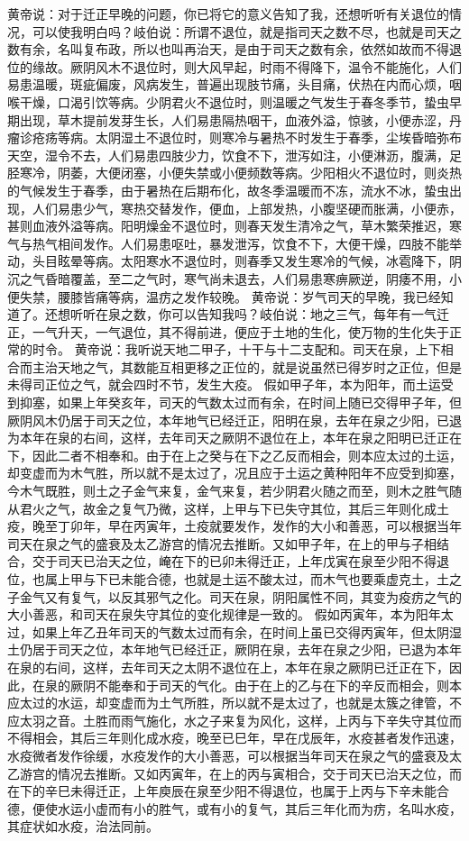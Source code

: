\documentclass[a4paper,12pt,UTF8,twoside]{ctexbook}
\begin{document}
黄帝说：对于迁正早晚的问题，你已将它的意义告知了我，还想听听有关退位的情况，可以使我明白吗？岐伯说：所谓不退位，就是指司天之数不尽，也就是司天之数有余，名叫复布政，所以也叫再治天，是由于司天之数有余，依然如故而不得退位的缘故。厥阴风木不退位时，则大风早起，时雨不得降下，温令不能施化，人们易患温暖，斑疵偏废，风病发生，普遍出现肢节痛，头目痛，伏热在内而心烦，咽喉干燥，口渴引饮等病。少阴君火不退位时，则温暖之气发生于春冬季节，蛰虫早期出现，草木提前发芽生长，人们易患隔热咽干，血液外溢，惊骇，小便赤涩，丹瘤诊疮疡等病。太阴湿土不退位时，则寒冷与暑热不时发生于春季，尘埃昏暗弥布天空，湿令不去，人们易患四肢少力，饮食不下，泄泻如注，小便淋沥，腹满，足胫寒冷，阴萎，大便闭塞，小便失禁或小便频数等病。少阳相火不退位时，则炎热的气候发生于春季，由于暑热在后期布化，故冬季温暖而不冻，流水不冰，蛰虫出现，人们易患少气，寒热交替发作，便血，上部发热，小腹坚硬而胀满，小便赤，甚则血液外溢等病。阳明燥金不退位时，则春天发生清冷之气，草木繁荣推迟，寒气与热气相间发作。人们易患呕吐，暴发泄泻，饮食不下，大便干燥，四肢不能举动，头目眩晕等病。太阳寒水不退位时，则春季又发生寒冷的气候，冰雹降下，阴沉之气昏暗覆盖，至二之气时，寒气尚未退去，人们易患寒痹厥逆，阴痿不用，小便失禁，腰膝皆痛等病，温疠之发作较晚。
黄帝说：岁气司天的早晚，我已经知道了。还想听听在泉之数，你可以告知我吗？岐伯说：地之三气，每年有一气迁正，一气升天，一气退位，其不得前进，便应于土地的生化，使万物的生化失于正常的时令。
黄帝说：我听说天地二甲子，十干与十二支配和。司天在泉，上下相合而主治天地之气，其数能互相更移之正位的，就是说虽然已得岁时之正位，但是未得司正位之气，就会四时不节，发生大疫。
假如甲子年，本为阳年，而土运受到抑塞，如果上年癸亥年，司天的气数太过而有余，在时间上随已交得甲子年，但厥阴风木仍居于司天之位，本年地气已经迁正，阳明在泉，去年在泉之少阳，已退为本年在泉的右间，这样，去年司天之厥阴不退位在上，本年在泉之阳明已迁正在下，因此二者不相奉和。由于在上之癸与在下之乙反而相会，则本应太过的土运，却变虚而为木气胜，所以就不是太过了，况且应于土运之黄种阳年不应受到抑塞，今木气既胜，则土之子金气来复，金气来复，若少阴君火随之而至，则木之胜气随从君火之气，故金之复气乃微，这样，上甲与下已失守其位，其后三年则化成土疫，晚至丁卯年，早在丙寅年，土疫就要发作，发作的大小和善恶，可以根据当年司天在泉之气的盛衰及太乙游宫的情况去推断。又如甲子年，在上的甲与子相结合，交于司天已治天之位，崦在下的已卯未得迁正，上年戊寅在泉至少阳不得退位，也属上甲与下已未能合德，也就是土运不酸太过，而木气也要乘虚克土，土之子金气又有复气，以反其邪气之化。司天在泉，阴阳属性不同，其变为疫疠之气的大小善恶，和司天在泉失守其位的变化规律是一致的。
假如丙寅年，本为阳年太过，如果上年乙丑年司天的气数太过而有余，在时间上虽已交得丙寅年，但太阴湿土仍居于司天之位，本年地气已经迁正，厥阴在泉，去年在泉之少阳，已退为本年在泉的右间，这样，去年司天之太阴不退位在上，本年在泉之厥阴已迁正在下，因此，在泉的厥阴不能奉和于司天的气化。由于在上的乙与在下的辛反而相会，则本应太过的水运，却变虚而为土气所胜，所以就不是太过了，也就是太簇之律管，不应太羽之音。土胜而雨气施化，水之子来复为风化，这样，上丙与下辛失守其位而不得相会，其后三年则化成水疫，晚至已巳年，早在戊辰年，水疫甚者发作迅速，水疫微者发作徐缓，水疫发作的大小善恶，可以根据当年司天在泉之气的盛衰及太乙游宫的情况去推断。又如丙寅年，在上的丙与寅相合，交于司天已治天之位，而在下的辛巳未得迁正，上年庾辰在泉至少阳不得退位，也属于上丙与下辛未能合德，便使水运小虚而有小的胜气，或有小的复气，其后三年化而为疠，名叫水疫，其症状如水疫，治法同前。
\end{document}
